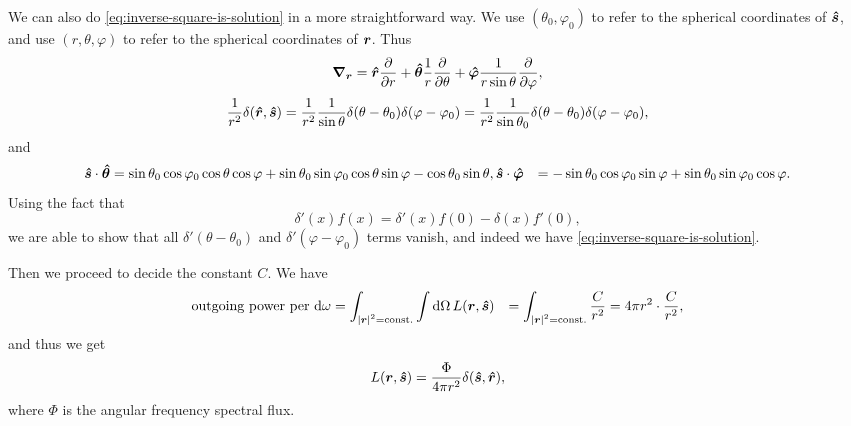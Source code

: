 \documentclass[hyperref, a4paper]{article}
\newcommand*{\const}{\mathrm{const}}
\def\\{}%
\begin{document}
We can also do \eqref{eq:inverse-square-is-solution} in a more straightforward way.
We use $(\theta_0, \varphi_0)$ to refer to the spherical coordinates of $\vu*{s}$,
and use $(r, \theta, \varphi)$ to refer to the spherical coordinates of $\vb*{r}$.
Thus 
\begin{equation}
    \grad_{\vb*{r}} = \vu*{r} \pdv{r} + \vu*{\theta} \frac{1}{r} \pdv{\theta} 
    + \vu*{\varphi} \frac{1}{r \sin \theta} \pdv{\varphi},
\end{equation}
\begin{equation}
    \frac{1}{r^2} \delta(\vu*{r}, \vu*{s}) = \frac{1}{r^2}
    \frac{1}{\sin \theta} \delta(\theta - \theta_0) \delta(\varphi - \varphi_0)
    = \frac{1}{r^2} \frac{1}{\sin \theta_0} \delta(\theta - \theta_0) \delta(\varphi - \varphi_0),
\end{equation}
and 
\begin{equation}
    \begin{aligned}
        \vu*{s} \cdot \vu*{\theta} &= \sin \theta_0 \cos \varphi_0 \cos \theta \cos \varphi
        + \sin \theta_0 \sin \varphi_0 \cos \theta \sin \varphi 
        - \cos \theta_0 \sin \theta, \\ 
        \vu*{s} \cdot \vu*{\varphi} &= - \sin \theta_0 \cos \varphi_0 \sin \varphi 
        + \sin \theta_0 \sin \varphi_0 \cos \varphi.
    \end{aligned}
\end{equation}
Using the fact that 
\begin{equation}
    \delta'(x) f(x) = \delta'(x) f(0) - \delta(x) f'(0),
    \label{eq:delta-prime-def}
\end{equation}
we are able to show that all $\delta'(\theta - \theta_0)$ and $\delta'(\varphi - \varphi_0)$
terms vanish, and indeed we have \eqref{eq:inverse-square-is-solution}.

Then we proceed to decide the constant $C$.
We have 
\begin{equation}
    \begin{aligned}
        \text{outgoing power per $\dd{\omega}$} &=
        \int_{\abs*{\vb*{r}}^2 = \const.} \int \dd{\Omega} L(\vb*{r}, \vu*{s}) \\
        &= \int_{\abs*{\vb*{r}}^2 = \const.} \frac{C}{r^2} = 4 \pi r^2 \cdot \frac{C}{r^2},
    \end{aligned}
    \label{eq:flux-around-point-source}
\end{equation}
and thus we get 
\begin{equation}
    L(\vb*{r}, \vu*{s}) = \frac{\Phi}{4 \pi r^2} \delta(\vu*{s}, \vu*{r}),
    \label{eq:ideal-inverse-square}
\end{equation}
where $\Phi$ is the angular frequency spectral flux. 
\end{document}
